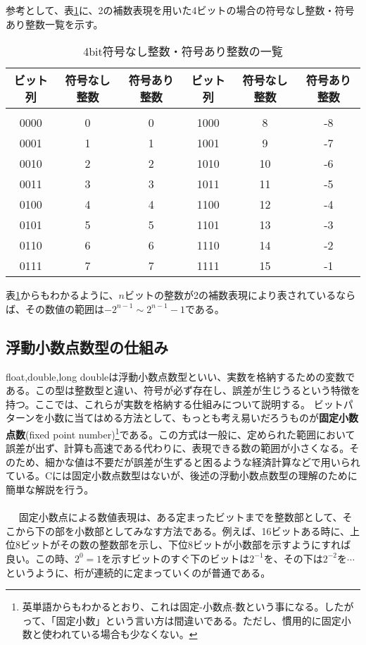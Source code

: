 参考として、表\ref{hosu}に、2の補数表現を用いた4ビットの場合の符号なし整数・符号あり整数一覧を示す。
\begin{table}[htb]
\centering
\caption{4bit符号なし整数・符号あり整数の一覧}\label{hosu}
\begin{tabular}{|c|c|c||c|c|c|}\hline
ビット列&符号なし整数&符号あり整数&ビット列&符号なし整数&符号あり整数\\ \hline
&&&&&\\[-16pt]\hline
0000&0&0&1000&8&-8\\ \hline
0001&1&1&1001&9&-7\\ \hline
0010&2&2&1010&10&-6\\ \hline
0011&3&3&1011&11&-5\\ \hline
0100&4&4&1100&12&-4\\ \hline
0101&5&5&1101&13&-3\\ \hline
0110&6&6&1110&14&-2\\ \hline
0111&7&7&1111&15&-1\\ \hline
\end{tabular}
\end{table}

表\ref{hosu}からもわかるように、$n$ビットの整数が2の補数表現により表されているならば、その数値の範囲は$-2^{n-1}\sim  2^{n-1}-1$である。

\subsection{浮動小数点数型の仕組み}
float,double,long doubleは浮動小数点数型といい、実数を格納するための変数である。この型は整数型と違い、符号が必ず存在し、誤差が生じうるという特徴を持つ。ここでは、これらが実数を格納する仕組みについて説明する。
ビットパターンを小数に当てはめる方法として、もっとも考え易いだろうものが\textbf{固定小数点数}(fixed point number)\footnote{英単語からもわかるとおり、これは固定-小数点-数という事になる。したがって、「固定小数」という言い方は間違いである。ただし、慣用的に固定小数と使われている場合も少なくない。}である。この方式は一般に、定められた範囲において誤差が出ず、計算も高速である代わりに、表現できる数の範囲が小さくなる。そのため、細かな値は不要だが誤差が生ずると困るような経済計算などで用いられている。Cには固定小数点数型はないが、後述の浮動小数点数型の理解のために簡単な解説を行う。
\\ \\　
固定小数点による数値表現は、ある定まったビットまでを整数部として、そこから下の部を小数部としてみなす方法である。例えば、16ビットある時に、上位8ビットがその数の整数部を示し、下位8ビットが小数部を示すようにすれば良い。この時、$2^0=1$を示すビットのすぐ下のビットは$2^{-1}$を、その下は$2^{-2}$を$\cdots$というように、桁が連続的に定まっていくのが普通である。

